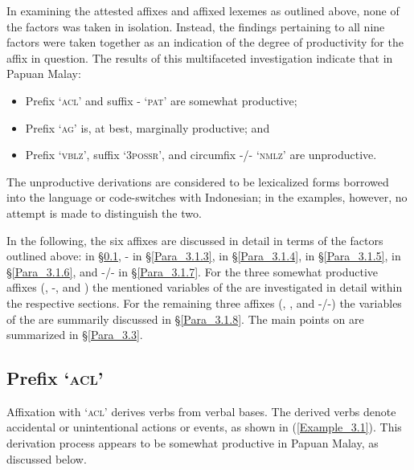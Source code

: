 In examining the attested affixes and affixed lexemes as outlined above, none of the factors was taken in isolation. Instead, the findings pertaining to all nine factors were taken together as an indication of the degree of productivity for the affix in question. The results of this multifaceted investigation indicate that in Papuan Malay:



\begin{itemize}
\item 
Prefix  ‘\textsc{acl}’ and suffix - ‘\textsc{pat}’ are somewhat productive;

\item 
Prefix  ‘\textsc{ag}’ is, at best, marginally productive; and

\item
Prefix  ‘\textsc{vblz}’, suffix  ‘\textsc{3possr}’, and circumfix -/- ‘\textsc{nmlz}’ are unproductive.

\end{itemize}

The unproductive derivations are considered to be lexicalized forms borrowed into the language or code-switches with Indonesian; in the examples, however, no attempt is made to distinguish the two.



In the following, the six affixes are discussed in detail in terms of the factors outlined above:  in §\ref{Para_3.1.2}, - in §\ref{Para_3.1.3},  in §\ref{Para_3.1.4},  in §\ref{Para_3.1.5}, \mbox{} in §\ref{Para_3.1.6}, and -/- in §\ref{Para_3.1.7}. For the three somewhat productive affixes (, -, and ) the mentioned variables of the  are investigated in detail within the respective sections. For the remaining three affixes (, , and -/-) the variables of the  are summarily discussed in §\ref{Para_3.1.8}. The main points on  are summarized in §\ref{Para_3.3}.


\subsection[Prefix {\TER}- ‘\textsc{acl}’]{Prefix  ‘\textsc{acl}’}\label{Para_3.1.2}
Affixation with  ‘\textsc{acl}’ derives  verbs from verbal bases. The derived verbs denote accidental or unintentional actions or events, as shown in (\ref{Example_3.1}). This derivation process appears to be somewhat productive in Papuan Malay, as discussed below.

